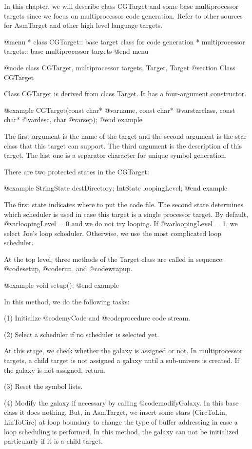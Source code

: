 In this chapter, we will describe class CGTarget and some base multiprocessor
targets since we focus on multiprocessor code generation. Refer to
other sources for AsmTarget and other high level language targets.
 
@menu
* class CGTarget::			base target class for code generation
* multiprocessor targets::		base multiprocessor targets
@end menu

@node class CGTarget, multiprocessor targets, Target, Target
@section Class CGTarget

Class CGTarget is derived from class Target. It has a four-argument
constructor.

@example
CGTarget(const char* @var{name}, const char* @var{starclass}, const char* @var{desc}, char @var{sep});
@end example

The first argument is the name of the target and the second argument is the
star class that this target can support. The third argument is the description
of this target. The last one is a separator character for unique symbol
generation.

There are two protected states in the CGTarget:

@example
StringState destDirectory;
IntState loopingLevel;
@end example

The first state indicates where to put the code file. The second state
determines which scheduler is used in case this target is a single
processor target. By default, @var{loopingLevel} = 0 and we do not
try looping. If @var{loopingLevel} = 1, we select Joe's loop scheduler.
Otherwise, we use the most complicated loop scheduler.

At the top level, three methods of the Target class are called in sequence:
@code{setup}, @code{run}, and @code{wrapup}. 

@example
void setup();
@end example

In this method, we do the following tasks:

(1) Initialize @code{myCode} and @code{procedure} code stream.

(2) Select a scheduler if no scheduler is selected yet.

At this stage, we check whether the galaxy is assigned or not. In
multiprocessor targets, a child target is not assigned a galaxy until
a sub-univers is created. If the galaxy is not assigned, return.

(3) Reset the symbol lists.

(4) Modify the galaxy if necessary by calling @code{modifyGalaxy}. In this
base class it does nothing. But, in AsmTarget, we insert some stars
(CircToLin, LinToCirc) at loop boundary to change the type of buffer
addressing in case a loop scheduling is performed. In this method,
the galaxy can not be initialized particularly if it is a child target.

